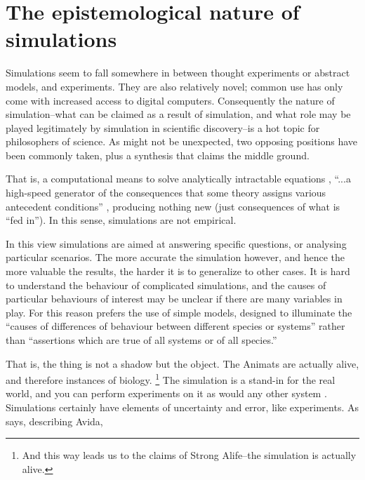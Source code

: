 \section{The epistemological nature of simulations}\label{the-epistemological-nature-of-simulations}

Simulations seem to fall somewhere in between thought experiments or abstract models, and experiments. They are also relatively novel; common use has only come with increased access to digital computers. Consequently the nature of simulation--what can be claimed as a result of simulation, and what role may be played legitimately by simulation in scientific discovery--is a hot topic for philosophers of science. As might not be unexpected, two opposing positions have been commonly taken, plus a synthesis that claims the middle ground.

\label{simulations-are-just-calculators}

That is, a computational means to solve analytically intractable equations \parencite[31]{Winsberg2010}, ``...a high-speed generator of the consequences that some theory assigns various antecedent conditions'' \parencite[quoting from Dennett]{Eldridge}, producing nothing new (just consequences of what is ``fed in''\parencite{DiPaolo2000}). In this sense, simulations are not empirical.

In this view simulations are aimed at answering specific questions, or analysing particular scenarios. The more accurate the simulation however, and hence the more valuable the results, the harder it is to generalize to other cases. It is hard to understand the behaviour of complicated simulations, and the causes of particular behaviours of interest may be unclear if there are many variables in play. For this reason \parencite{MaynardSmith1974} prefers the use of simple models, designed to illuminate the ``causes of differences of behaviour between different species or systems'' rather than ``assertions which are true of all systems or of all species.''

\label{simulations-are-themselves-an-instance-of-the-thing}

That is, the thing is not a shadow but the object. The Animats are actually alive, and therefore instances of biology.
\footnote{And this way leads us to the claims of Strong Alife--the simulation is actually alive.}
The simulation is a stand-in for the real world, and you can perform experiments on it as would any other system \parencite[31]{Winsberg2010}. Simulations certainly have elements of uncertainty and error, like experiments. As \parencite{Adami2002} says, describing Avida, 


